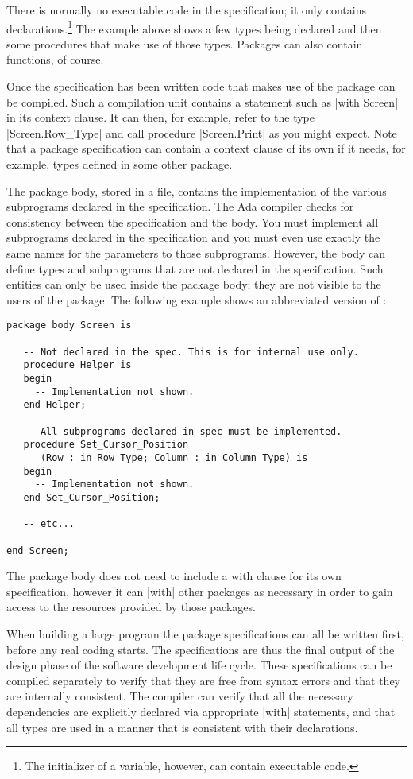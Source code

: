 There is normally no executable code in the specification; it only contains
declarations.\footnote{The initializer of a variable, however, can contain executable code.} The
example above shows a few types being declared and then some procedures that make use of those
types. Packages can also contain functions, of course.

Once the specification has been written code that makes use of the package can be compiled. Such
a compilation unit contains a statement such as |with Screen| in its context clause. It can
then, for example, refer to the type |Screen.Row_Type| and call procedure |Screen.Print| as you
might expect. Note that a package specification can contain a context clause of its own if it
needs, for example, types defined in some other package.

The package body, stored in a  file, contains the implementation of the various
subprograms declared in the specification. The Ada compiler checks for consistency between the
specification and the body. You must implement all subprograms declared in the specification and
you must even use exactly the same names for the parameters to those subprograms. However,
the body can define types and subprograms that are not declared in the specification. Such
entities can only be used inside the package body; they are not visible to the users of the
package. The following example shows an abbreviated version of :

\begin{lstlisting}
package body Screen is

   -- Not declared in the spec. This is for internal use only.
   procedure Helper is
   begin
     -- Implementation not shown.
   end Helper;

   -- All subprograms declared in spec must be implemented.
   procedure Set_Cursor_Position
      (Row : in Row_Type; Column : in Column_Type) is
   begin
     -- Implementation not shown.
   end Set_Cursor_Position;

   -- etc...

end Screen;
\end{lstlisting}

The package body does not need to include a with clause for its own specification, however it
can |with| other packages as necessary in order to gain access to the resources provided by
those packages.

When building a large program the package specifications can all be written first, before any
real coding starts. The specifications are thus the final output of the design phase of the
software development life cycle. These specifications can be compiled separately to verify that
they are free from syntax errors and that they are internally consistent. The compiler can
verify that all the necessary dependencies are explicitly declared via appropriate |with|
statements, and that all types are used in a manner that is consistent with their declarations.

